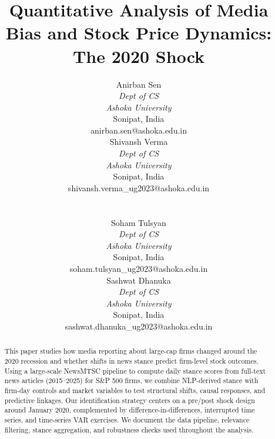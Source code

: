 \documentclass[conference]{IEEEtran}
\begin{document}
\title{Quantitative Analysis of Media Bias and Stock Price Dynamics: The 2020 Shock}

\author{\small
\begin{minipage}[t]{0.48\textwidth}
\centering
Anirban Sen \\
\textit{Dept of CS} \\
\textit{Ashoka University} \\
Sonipat, India \\
anirban.sen@ashoka.edu.in
\end{minipage}
\hfill
\begin{minipage}[t]{0.48\textwidth}
\centering
Shivansh Verma \\
\textit{Dept of CS} \\
\textit{Ashoka University} \\
Sonipat, India \\
shivansh.verma\_ug2023@ashoka.edu.in
\end{minipage}
\\[0.6em]
\begin{minipage}[t]{0.48\textwidth}
\centering
Soham Tulsyan \\
\textit{Dept of CS} \\
\textit{Ashoka University} \\
Sonipat, India \\
soham.tulsyan\_ug2023@ashoka.edu.in
\end{minipage}
\hfill
\begin{minipage}[t]{0.48\textwidth}
\centering
Sashwat Dhanuka \\
\textit{Dept of CS} \\
\textit{Ashoka University} \\
Sonipat, India \\
sashwat.dhanuka\_ug2023@ashoka.edu.in
\end{minipage}
}

\maketitle

\thispagestyle{empty}

\begin{abstract}
This paper studies how media reporting about large-cap firms changed around the 2020 recession and whether shifts in news stance predict firm-level stock outcomes. Using a large-scale NewsMTSC pipeline to compute daily stance scores from full-text news articles (2015--2025) for S\&P 500 firms, we combine NLP-derived stance with firm-day controls and market variables to test structural shifts, causal responses, and predictive linkages. Our identification strategy centers on a pre/post shock design around January 2020, complemented by difference-in-differences, interrupted time series, and time-series VAR exercises. We document the data pipeline, relevance filtering, stance aggregation, and robustness checks used throughout the analysis.
\end{abstract}
\end{document}
